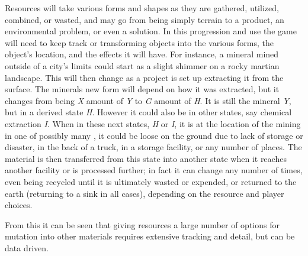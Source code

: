 Resources will take various forms and shapes as they are gathered, utilized, combined, or wasted, and may go from being simply terrain to a product, an environmental problem, or even a solution. In this progression and use the game will need to keep track or transforming objects into the various forms, the object's location, and the effects it will have. For instance, a mineral mined outside of a city's limits could start as a slight shimmer on a rocky martian landscape. This will then change as a project is set up extracting it from the surface. The minerals new form will depend on how it was extracted, but it changes from being {\it X} amount of {\it Y} to {\it G} amount of {\it H}. It is still the mineral {\it Y}, but in a derived state {\it H}. However it could also be in other states, say chemical extraction {\it I}. When in these next states, {\it H} or {\it I}, it is at the location of the mining in one of possibly many , it could be loose on the ground due to lack of storage or disaster, in the back of a truck, in a storage facility, or any number of places. The material is then transferred from this state into another state when it reaches another facility or is processed further; in fact it can change any number of times, even being recycled until it is ultimately wasted or expended, or returned to the earth (returning to a sink in all cases), depending on the resource and player choices. 

From this it can be seen that giving resources a large number of options for mutation into other materials requires extensive tracking and detail, but can be data driven.

